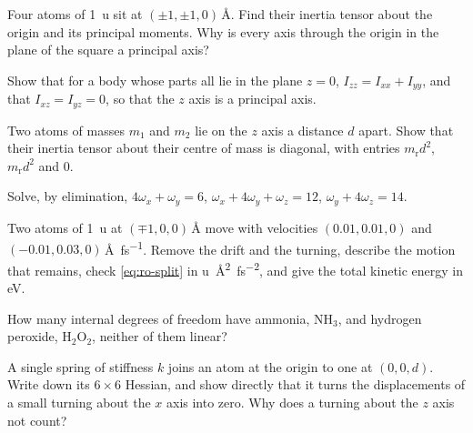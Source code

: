 \begin{exercise}
\label{ex:ro-square}
Four atoms of \SI{1}{\amu} sit at $(\pm1, \pm1, 0)$\,\si{\angstrom}. Find
their inertia tensor about the origin and its principal moments. Why is
every axis through the origin in the plane of the square a principal axis?
\end{exercise}

\begin{exercise}
\label{ex:ro-flat}
Show that for a body whose parts all lie in the plane $z = 0$, $I_{zz} =
I_{xx} + I_{yy}$, and that $I_{xz} = I_{yz} = 0$, so that the $z$ axis is a
principal axis.
\end{exercise}

\begin{exercise}
\label{ex:ro-diatomic}
Two atoms of masses $m_1$ and $m_2$ lie on the $z$ axis a distance $d$
apart. Show that their inertia tensor about their centre of mass is
diagonal, with entries $m_{\mathrm r}d^2$, $m_{\mathrm r}d^2$ and 0.
\end{exercise}

\begin{exercise}[elimination]
\label{ex:ro-solve}
Solve, by elimination, $4\omega_x + \omega_y = 6$, $\omega_x + 4\omega_y +
\omega_z = 12$, $\omega_y + 4\omega_z = 14$.
\end{exercise}

\begin{exercise}
\label{ex:ro-left}
Two atoms of \SI{1}{\amu} at $(\mp1, 0, 0)$\,\si{\angstrom} move with
velocities $(0.01, 0.01, 0)$ and $(-0.01, 0.03,
0)$\,\si{\angstrom\per\femto\second}. Remove the drift and the turning,
describe the motion that remains, check \cref{eq:ro-split} in
\si{\amu\angstrom\squared\per\femto\second\squared}, and give the total
kinetic energy in \si{\electronvolt}.
\end{exercise}

\begin{exercise}[counting]
\label{ex:ro-count}
How many internal degrees of freedom have ammonia, NH$_3$, and hydrogen
peroxide, H$_2$O$_2$, neither of them linear?
\end{exercise}

\begin{exercise}
\label{ex:ro-null}
A single spring of stiffness $k$ joins an atom at the origin to one at $(0,
0, d)$. Write down its $6\times6$ Hessian, and show directly that it turns
the displacements of a small turning about the $x$ axis into zero. Why does
a turning about the $z$ axis not count?
\end{exercise}

